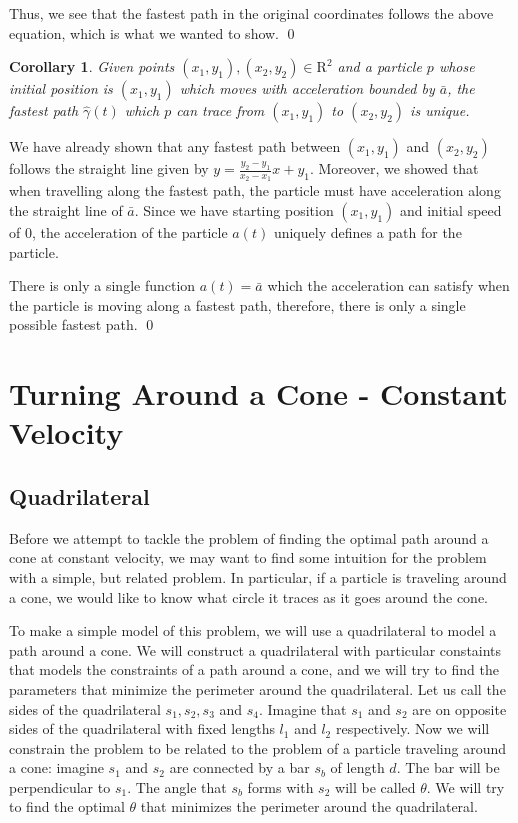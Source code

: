 \documentclass[12pt]{amsart}   %
\newtheorem{corollary}[theorem]{Corollary}
\begin{document}
Thus, we see that the fastest path in the original coordinates follows the above equation, which is what we wanted to show.
\qed

\begin{corollary}
  Given points $(x_1, y_1), (x_2, y_2) \in \mathrm{R}^2$ and a particle $p$ whose initial position is $(x_1, y_1)$ which moves with acceleration bounded by $\bar{a}$, the fastest path $\hat{\gamma}(t)$ which $p$ can trace from $(x_1, y_1)$ to $(x_2, y_2)$ is unique.
\end{corollary}
\proof We have already shown that any fastest path between $(x_1, y_1)$ and $(x_2, y_2)$ follows the straight line given by $y = \frac{y_2 - y_1}{x_2 - x_1} x + y_1$. Moreover, we showed that when travelling along the fastest path, the particle must have acceleration along the straight line of $\bar{a}$. Since we have starting position $(x_1, y_1)$ and initial speed of $0$, the acceleration of the particle $a(t)$ uniquely defines a path for the particle.

There is only a single function $a(t) = \bar{a}$ which the acceleration can satisfy when the particle is moving along a fastest path, therefore, there is only a single possible fastest path.
\qed

\section{Turning Around a Cone - Constant Velocity}

\subsection{Quadrilateral}

Before we attempt to tackle the problem of finding the optimal path around a cone at constant velocity, we may want to find some intuition for the problem with a simple, but related problem. In particular, if a particle is traveling around a cone, we would like to know what circle it traces as it goes around the cone.

To make a simple model of this problem, we will use a quadrilateral to model a path around a cone. We will construct a quadrilateral with particular constaints that models the constraints of a path around a cone, and we will try to find the parameters that minimize the perimeter around the quadrilateral. Let us call the sides of the quadrilateral $s_1, s_2, s_3$ and $s_4$. Imagine that $s_1$ and $s_2$ are on opposite sides of the quadrilateral with fixed lengths $l_1$ and $l_2$ respectively. Now we will constrain the problem to be related to the problem of a particle traveling around a cone: imagine $s_1$ and $s_2$ are connected by a bar $s_b$ of length $d$. The bar will be perpendicular to $s_1$. The angle that $s_b$ forms with $s_2$ will be called $\theta$. We will try to find the optimal $\theta$ that minimizes the perimeter around the quadrilateral.
\end{document}
